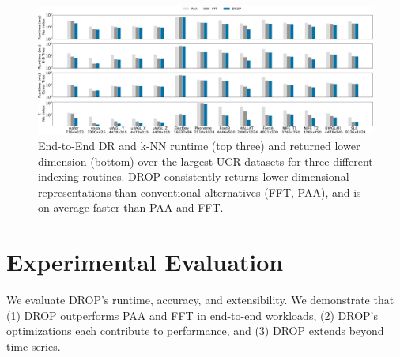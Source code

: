 
\begin{figure}[t!]
\includegraphics[width=\linewidth]{figs/KNNraw-revision.pdf}
\caption[]{End-to-End DR and k-NN runtime (top three) and returned lower dimension (bottom) over the largest UCR datasets for three different indexing routines. DROP consistently returns lower dimensional representations than conventional alternatives (FFT, PAA), and is on average faster than PAA and FFT.}
\label{fig:knnAll}
\end{figure}

\section{Experimental Evaluation}
\label{sec:experiments}

We evaluate DROP's runtime, accuracy, and extensibility. We demonstrate that (1) DROP outperforms PAA and FFT in end-to-end workloads, (2) DROP's optimizations each contribute to performance,  and (3) DROP extends beyond time series.

